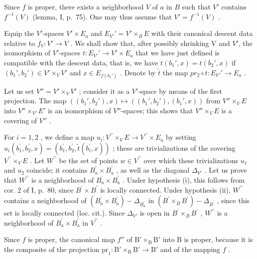 Since \(f\) is proper, there exists a neighborhood \(V\) of \(a\) in \(B\) such that \(V'\) contains \(f^{-1}(V)\) (lemma, I, p.~75). One may thus assume that \(V' = f^{-1}(V)\) .

Equip the \(V'\)-spaces \(V' \times E_{a}\) and \(E_{V'}' = V' \times_{B} E\) with their canonical descent data relative to \(f_{V}: V' \to V\) . We shall show that, after possibly shrinking V and \(V'\), the isomorphism of \(V'\)-spaces \(t: E_{V'}' \to V' \times E_{a}\) that we have just defined is compatible with the descent data, that is, we have \(t(b_{1}', x) = t(b_{2}', x)\) if \((b_{1}', b_{2}') \in V' \times_{V} V'\) and \(x \in E_{f(b_{1}')}\) . Denote by \(\widetilde{t}\) the map \(pr_{2} \circ t: E_{V'}' \to E_{a}\) .

Let us set \(V'' = V' \times_{V} V'\) ; consider it as a \(V'\)-space by means of the first projection. The map \(((b_{1}', b_{2}'), x) \mapsto ((b_{1}', b_{2}'), (b_{1}', x))\) from \(V'' \times_{V} E\) into \(V'' \times_{V'} E'\) is an isomorphism of \(V''\)-spaces; this shows that \(V'' \times_{V} E\) is a covering of \(V''\) .

For \(i=1,2\) , we define a map \(u_{i}\colon V^{\prime\prime}\times_{V}E\to V^{\prime\prime}\times E_{a}\) by setting \(u_{i}(b_{1}^{\prime},b_{2}^{\prime},x)=(b_{1}^{\prime},b_{2}^{\prime},\widetilde{t}(b_{i}^{\prime},x))\) ; these are trivializations of the covering \(V^{\prime\prime}\times_{V}E\) . Let \(W^{\prime\prime}\) be the set of points \(w\in V^{\prime\prime}\) over which these trivializations \(u_{1}\) and \(u_{2}\) coincide; it contains \(B_{a}^{\prime}\times B_{a}^{\prime}\) , as well as the diagonal \(\Delta_{V'}\) . Let us prove that \(W^{\prime\prime}\) is a neighborhood of \(B_{a}^{\prime}\times B_{a}^{\prime}\) . Under hypothesis (i), this follows from cor. 2 of I, p.~80, since \(B^{\prime}\times B^{\prime}\) is locally connected. Under hypothesis (ii), \(W^{\prime\prime}\) contains a neighborhood of \((B_{a}^{\prime}\times B_{a}^{\prime})-\Delta_{B_{a}^{\prime}}\) in \((B^{\prime}\times_{B}B^{\prime})-\Delta_{B^{\prime}}\) , since this set is locally connected (loc. cit.). Since \(\Delta_{V'}\) is open in \(B^{\prime}\times_{B}B^{\prime}\) , \(W^{\prime\prime}\) is a neighborhood of \(B_{a}^{\prime}\times B_{a}^{\prime}\) in \(V^{\prime\prime}\) .

Since \(f\) is proper, the canonical map \(f''\) of \(\mathrm{B}' \times_{\mathrm{B}} \mathrm{B}'\) into B is proper, because it is the composite of the projection \(\mathrm{pr}_{1} \colon \mathrm{B}' \times_{\mathrm{B}} \mathrm{B}' \to \mathrm{B}'\) and of the mapping \(f\) .

